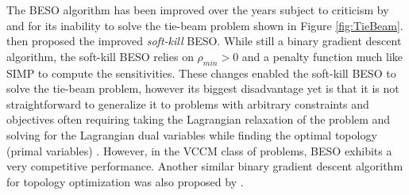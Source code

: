 The BESO algorithm has been improved over the years subject to criticism by \cite{Zhou2001} and \cite{Rozvany2009} for its inability to solve the tie-beam problem shown in Figure \ref{fig:TieBeam}. \cite{Huang2010a} then proposed the improved \textit{soft-kill} BESO. While still a binary gradient descent algorithm, the soft-kill BESO relies on $\rho_{min} > 0$ and a penalty function much like SIMP to compute the sensitivities. These changes enabled the soft-kill BESO to solve the tie-beam problem, however its biggest disadvantage yet is that it is not straightforward to generalize it to problems with arbitrary constraints and objectives often requiring taking the Lagrangian relaxation of the problem and solving for the Lagrangian dual variables while finding the optimal topology (primal variables) \citep{Huang2010a}. However, in the VCCM class of problems, BESO exhibits a very competitive performance. Another similar binary gradient descent algorithm for topology optimization was also proposed by \cite{Browne2013}.

